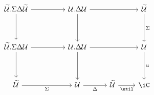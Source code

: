 \[\begin{tikzcd}
	{\Tm.\Sigma\Delta\Tm} && {\Ty.\Delta\Ty} && \Tm \\
	\\
	{\Tm.\Sigma\Delta\Ty} && {\Ty.\Delta\Ty} && \Ty \\
	\\
	\Tm && \Ty & \Tm & \iC
	\arrow["\Delta"', from=5-3, to=5-4]
	\arrow["\util"', from=5-4, to=5-5]
	\arrow["u", from=3-5, to=5-5]
	\arrow[from=3-3, to=5-3]
	\arrow[from=3-3, to=3-5]
	\arrow["\Sigma"', from=5-1, to=5-3]
	\arrow[from=3-1, to=5-1]
	\arrow[from=3-1, to=3-3]
	\arrow["\Sigma", from=1-5, to=3-5]
	\arrow[from=1-3, to=3-3]
	\arrow[from=1-3, to=1-5]
	\arrow[from=1-1, to=1-3]
	\arrow[from=1-1, to=3-1]
\end{tikzcd}\]